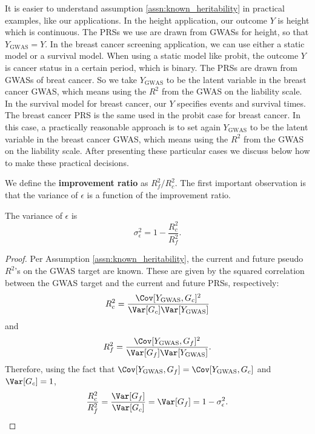 \documentclass[12pt]{article}
\begin{document}
It is easier to understand assumption \ref{assn:known_heritability} in practical examples, like our applications. In the height application, our outcome $Y$ is height which is continuous. The PRSs we use are drawn from GWASs for height, so that $Y_{\text{GWAS}} = Y$. In the breast cancer screening application, we can use either a static model or a survival model. When using a static model like probit, the outcome $Y$ is cancer status in a certain period, which is binary. The PRSs are drawn from GWASs of breat cancer. So we take $Y_{\text{GWAS}}$ to be the latent variable in the breast cancer GWAS, which means using the $R^2$ from the GWAS on the liability scale. In the survival model for breast cancer, our $Y$ specifies events and survival times. The breast cancer PRS is the same used in the probit case for breast cancer. In this case, a practically reasonable approach is to set again $Y_{\text{GWAS}}$ to be the latent variable in the breast cancer GWAS, which means using the $R^2$ from the GWAS on the liability scale. After presenting these particular cases we discuss below how to make these practical decisions.

We define the \textbf{improvement ratio} as $R^2_f / R^2_c$. The first important observation is that the variance of $\epsilon$ is a function of the improvement ratio.

\begin{lemma}
    \label{lemm:variance_epsilon}
    The variance of $\epsilon$ is
    \begin{equation}
        \sigma^2_\epsilon = 1 - \frac{R_c^2}{R_f^2}.
        \label{eq:sigma2_eps_R2_formula}
    \end{equation}
\end{lemma}

\begin{proof}
    Per Assumption \ref{assn:known_heritability}, the current and future pseudo $R^2$'s on the GWAS target are known. These are given by the squared correlation between the GWAS target and the current and future PRSs, respectively: 
    \[R_{c}^{2}=\frac{\Cov[Y_{\text{GWAS}},G_{c}]^{2}}{\Var[G_{c}]\Var[Y_{\text{GWAS}}]}\]
    and
    \[R_{f}^{2}=\frac{\Cov[Y_{\text{GWAS}},G_{f}]^{2}}{\Var[G_{f}]\Var[Y_{\text{GWAS}}]}\text{.}\]
    Therefore, using the fact that $\Cov[Y_{\text{GWAS}},G_{f}] = \Cov[Y_{\text{GWAS}},G_{c}]$ and $\Var[G_c] = 1$,
    \[\frac{R_{c}^{2}}{R_{f}^{2}}
    =
    \frac{\Var[G_{f}]}{\Var[G_{c}]}
    =
    \Var[G_{f}]
    =
    1 - \sigma^2_\epsilon
    \text{.}\]
\end{proof}
\end{document}
